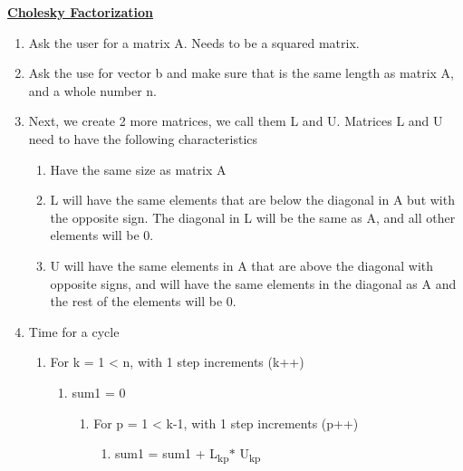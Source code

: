 \documentclass[12pt]{article}
\renewcommand{\_}{\kern-1.5pt\textunderscore\kern-1.5pt}
\begin{document}
\textbf{\uline{Cholesky Factorization }}\par

\begin{enumerate}
	\item Ask the user for a matrix A. Needs to be a squared matrix. \par

	\item Ask the use for vector b and make sure that is the same length as matrix A, and a whole number n. \par

	\item Next, we create 2 more matrices, we call them L and U. Matrices L and U need to have the following characteristics\par

\begin{enumerate}
	\item Have the same size as matrix A \par

	\item L will have the same elements that are below the diagonal in A but with the opposite sign. The diagonal in L will be the same as A, and all other elements will be 0. \par

	\item U will have the same elements in A that are above the diagonal with opposite signs, and will have the same elements in the diagonal as A and the rest of the elements will be 0.\par


\end{enumerate}
	\item Time for a cycle\par

\begin{enumerate}
	\item For k = 1 < n, with 1 step increments (k++)\par

\begin{enumerate}
	\item sum1 = 0\par

\begin{enumerate}
	\item For p = 1 < k-1, with 1 step increments (p++)\par

\begin{enumerate}
	\item sum1 = sum1 + L\textsubscript{kp}$\ast$  U\textsubscript{kp}\par



\end{enumerate}
\end{enumerate}
\end{enumerate}
\end{enumerate}
\end{enumerate}
\end{document}
